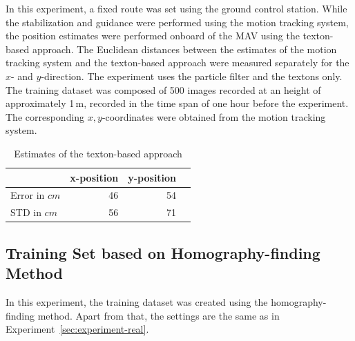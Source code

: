 \documentclass{report}
\begin{document}
In this experiment, a fixed route was set using the ground control
station. While the stabilization and guidance were performed using the
motion tracking system, the position estimates were performed onboard
of the MAV using the texton-based approach. The Euclidean distances
between the estimates of the motion tracking system and the
texton-based approach were measured separately for the $x$- and
$y$-direction. The experiment uses the particle filter and the textons
only. The training dataset was composed of 500 images recorded at an
height of approximately 1\,m, recorded in the time span of one hour
before the experiment. The corresponding $x,y$-coordinates were
obtained from the motion tracking system.

\begin{table}[H]
  \centering
  \begin{tabular}{lrrr}
    \toprule
    & x-position & y-position\\
    \midrule
    Error in $cm$ & 46 & 54\\
    STD in $cm$ & 56 & 71\\
    \bottomrule
  \end{tabular}
  \caption[Estimates of the texton-based approach]{Estimates of the texton-based approach}
  \label{tab:route}
\end{table}

\subsection{Training Set based on Homography-finding Method}
\label{sec:traininghomo}

In this experiment, the training dataset was created using the
homography-finding method. Apart from that, the settings are the same
as in Experiment~\ref{sec:experiment-real}.
\end{document}
